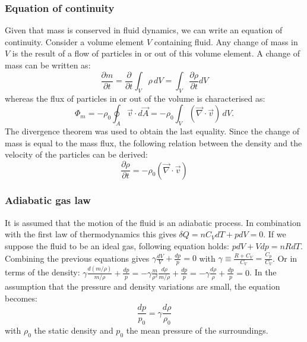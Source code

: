 \subsubsection*{Equation of continuity}
Given that mass is conserved in fluid dynamics, we can write an equation of continuity. Consider a volume element $V$ containing fluid. Any change of mass in $V$ is the result of a flow of particles in or out of this volume element. A change of mass can be written as:
\[
\frac{\partial m}{\partial t} = \frac{\partial }{\partial t} \int_{V} \rho \,dV =\int_{V} \frac{\partial \rho}{\partial t} dV
\]
whereas the flux of particles in or out of the volume is characterised as:
\[
\Phi_m
= - \rho_0 \oint_A \vec{v} \cdot d\vec{A}
= - \rho_0 \int_{V} (\vec{\nabla} \cdot \vec{v}) \, dV.
\]
The divergence theorem was used to obtain the last equality.
Since the change of mass is equal to the mass flux, the following relation between the density and the velocity of the particles can be derived:
\begin{equation}
\frac{\partial \rho}{\partial t}  = - \rho_0 (\vec{\nabla} \cdot \vec{v})
\label{cont}
\end{equation}


\subsubsection*{Adiabatic gas law}
It is assumed that the motion of the fluid is an adiabatic process. In combination with the first law of thermodynamics this gives $\delta Q = n C_V dT + p dV = 0$.
If we suppose the fluid to be an ideal gas, following equation holds: $p dV + V dp = n R dT$.
Combining the previous equations gives $\gamma \frac{dV}{V} + \frac{dp}{p} = 0$ with $\gamma \equiv \frac{R+C_V}{C_V} = \frac{C_p}{C_V}$.
Or in terms of the density: $\gamma \frac{d(m/\rho)}{m/ \rho} + \frac{dp}{p} = -\gamma \frac{m}{\rho^2} \frac{d\rho}{m/ \rho} + \frac{dp}{p} =- \gamma \frac{d\rho}{\rho} + \frac{dp}{p} =0$.
In the assumption that the pressure and density variations are small, the equation becomes:
\begin{equation}
\frac{dp}{p_0} =\gamma \frac{d\rho}{\rho_0}
\label{adia}
\end{equation}
with $\rho_0$ the static density and $p_0$ the mean pressure of the surroundings.





